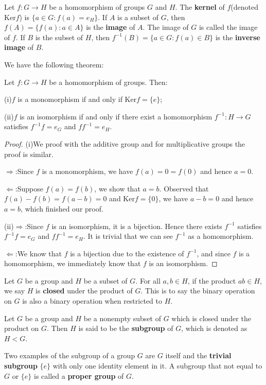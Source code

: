 \begin{definition}
Let $f:G\to H$ be a homomorphism of groups $G$ and $H$. The \textbf{kernel} of $f$(denoted $\mathrm{Ker}f$) is $\{a\in G:f(a)=e_H\}$. If $A$ is a subset of $G$, then $f(A)=\{f(a):a\in A\}$ is the \textbf{image} of $A$. The image of $G$ is called the image of $f$. If $B$ is the subset of $H$, then $f^{-1}(B)=\{a\in G:f(a)\in B\}$ is the \textbf{inverse image} of $B$.
\end{definition}
We have the following theorem:
\begin{theorem}
Let $f:G\to H$ be a homomorphism of groups. Then:\par
(i)$f$ is a monomorphism if and only if $\mathrm{Ker}f=\{e\}$;\par
(ii)$f$ is an isomorphism if and only if there exist a homomorphism $f^{-1}:H\to G$ satisfies $f^{-1}f=e_G$ and $ff^{-1}=e_H$.
\end{theorem}
\begin{proof}
(i)We proof with the additive group and for multiplicative groups the proof is similar.\par
$\Rightarrow$:Since $f$ is a monomorphism, we have $f(a)=0=f(0)$ and hence $a=0$.\par
$\Leftarrow$:Suppose $f(a)=f(b)$, we show that $a=b$. Observed that $f(a)-f(b)=f(a-b)=0$ and $\mathrm{Ker}f=\{0\}$, we have $a-b=0$ and hence $a=b$, which finished our proof.\par
(ii)$\Rightarrow$:Since $f$ is an isomorphism, it is a bijection. Hence there exists $f^{-1}$ satisfies $f^{-1}f=e_G$ and $ff^{-1}=e_H$. It is trivial that we can see $f^{-1}$ as a homomorphism.\par
$\Leftarrow$:We know that $f$ is a bijection due to the existence of $f^{-1}$, and since $f$ is a homomorphism, we immediately know that $f$ is an isomorphism.
\end{proof}
Let $G$ be a group and $H$ be a subset of $G$. For all $a,b\in H$, if the product $ab\in H$, we say $H$ is \textbf{closed} under the product of $G$. This is to say the binary operation on $G$ is also a binary operation when restricted to $H$.
\begin{definition}
Let $G$ be a group and $H$ be a nonempty subset of $G$ which is closed under the product on $G$. Then $H$ is said to be the \textbf{subgroup} of $G$, which is denoted as $H<G$.
\end{definition}
Two examples of the subgroup of a group $G$ are $G$ itself and the \textbf{trivial subgroup} $\{e\}$ with only one identity element in it. A subgroup that not equal to $G$ or $\{e\}$ is called a \textbf{proper group} of $G$.\par
